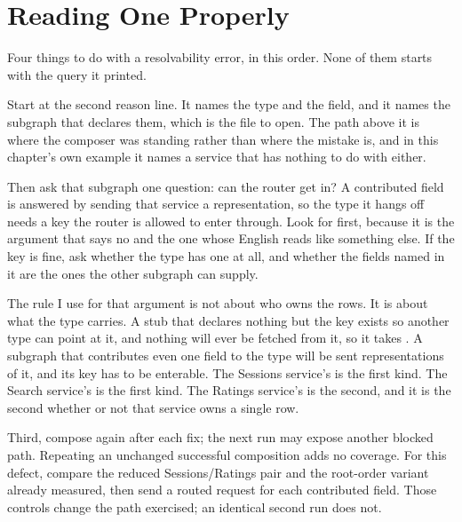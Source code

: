\section{Reading One Properly}
\label{sec:ch15-reading-one-properly}

%
Four things to do with a resolvability error, in this order. None of them
starts with the query it printed.

%
Start at the second reason line. It names the type and the field, and it names
the subgraph that declares them, which is the file to open. The path above it
is where the composer was standing rather than where the mistake is, and in
this chapter's own example it names a service that has nothing to do with
either.

%
Then ask that subgraph one question: can the router get in? A contributed
field is answered by sending that service a representation, so the type it
hangs off needs a key the router is allowed to enter through. Look for
 first, because it is the argument that says no and the
one whose English reads like something else. If the key is fine, ask whether
the type has one at all, and whether the fields named in it are the ones the
other subgraph can supply.

%
The rule I use for that argument is not about who owns the rows. It is about
what the type carries. A stub that declares nothing but the key exists so
another type can point at it, and nothing will ever be fetched from it, so it
takes . A subgraph that contributes even one field to
the type will be sent representations of it, and its key has to be enterable.
The Sessions service's  is the first kind. The Search service's
 is the first kind. The Ratings service's  is the
second, and it is the second whether or not that service owns a single row.

%
Third, compose again after each fix; the next run may expose another blocked
path. Repeating an unchanged successful composition adds no coverage. For this
defect, compare the reduced Sessions/Ratings pair and the root-order variant
already measured, then send a routed request for each contributed field.
Those controls change the path exercised; an identical second run does not.

